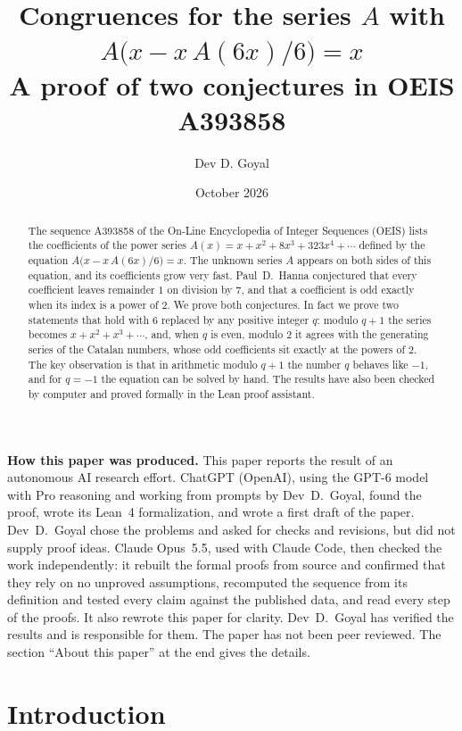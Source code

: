 \documentclass[11pt,a4paper]{article}
\title{Congruences for the series $A$ with $A\bigl(x-x\,A(6x)/6\bigr)=x$\\[6pt]\large A proof of two conjectures in OEIS A393858}
\author{Dev D. Goyal}
\date{October 2026}
\theoremstyle{definition}
\theoremstyle{remark}
\begin{document}
\maketitle
\begin{abstract}
The sequence A393858 of the On-Line Encyclopedia of Integer Sequences (OEIS) lists the coefficients of the power
series $A(x)=x+x^2+8x^3+323x^4+\cdots$ defined by the equation
$A\bigl(x-x\,A(6x)/6\bigr)=x$. The unknown series $A$ appears on both sides of this equation, and its coefficients grow very fast.
Paul~D.~Hanna conjectured that every coefficient leaves remainder $1$ on division by $7$, and that a coefficient is odd exactly when its index is a power of $2$. We prove both conjectures. In fact we prove two statements that hold with $6$ replaced by any positive integer $q$: modulo $q+1$ the series becomes $x+x^2+x^3+\cdots$, and, when $q$ is even, modulo $2$ it agrees with the generating series of the Catalan numbers, whose odd coefficients sit exactly at the powers of $2$. The key observation is that in arithmetic modulo $q+1$ the number $q$ behaves like $-1$, and
for $q=-1$ the equation can be solved by hand. The results have also been checked by computer and proved formally in the
Lean proof assistant.
\end{abstract}
\begin{center}\begin{minipage}{0.88\linewidth}\small
\textbf{How this paper was produced.} This paper reports the result of an autonomous AI research effort.
ChatGPT (OpenAI), using the GPT-6 model with Pro reasoning and working from prompts by Dev~D.~Goyal, found the proof, wrote its Lean~4 formalization, and wrote a first draft of the paper.
Dev~D.~Goyal chose the problems and asked for checks and revisions, but did not supply proof ideas.
Claude Opus~5.5, used with Claude Code, then checked the work independently: it rebuilt the formal proofs from
source and confirmed that they rely on no unproved assumptions, recomputed the sequence from its definition and tested
every claim against the published data, and read every step of the proofs. It also rewrote this paper for clarity.
Dev~D.~Goyal has verified the results and is responsible for them. The paper has not been peer reviewed.
The section ``About this paper'' at the end gives the details.
\end{minipage}\end{center}

\section{Introduction}
\end{document}
